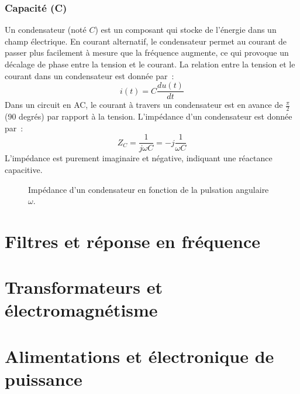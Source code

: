 \subsubsection{Capacit\'e (C)}
Un condensateur (not\'e \(C\)) est un composant qui stocke de l'\'energie dans un champ \'electrique. En courant alternatif, le condensateur permet au courant de passer plus facilement à mesure que la fr\'equence augmente, ce qui provoque un d\'ecalage de phase entre la tension et le courant. La relation entre la tension et le courant dans un condensateur est donn\'ee par~:
\[i(t) = C \frac{du(t)}{dt}\]
Dans un circuit en AC, le courant à travers un condensateur est en avance de \(\frac{\pi}{2}\) (90 degr\'es) par rapport à la tension.
L'imp\'edance d'un condensateur est donn\'ee par~:
\[Z_C = \frac{1}{j\omega C} = -j\frac{1}{\omega C}\]
L'imp\'edance est purement imaginaire et n\'egative, indiquant une r\'eactance capacitive.
\begin{figure}[h!]
    \centering
    \caption{Imp\'edance d'un condensateur en fonction de la pulsation angulaire $\omega$.}
    \label{fig:impedance_condensateur}
\end{figure}


\section{Filtres et r\'eponse en fr\'equence} \label{subsec:filters}
\section{Transformateurs et \'electromagn\'etisme} \label{subsec:transformers}
\section{Alimentations et \'electronique de puissance} \label{subsec:power_supplies}
